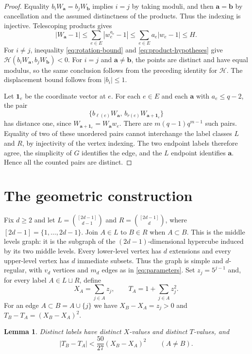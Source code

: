 \documentclass[a4paper,11pt]{amsart}
\newtheorem{lemma}[theorem]{Lemma}
\theoremstyle{remark}
\newcommand{\Hh}{\mathcal H}
\begin{document}
\begin{proof}
Equality $b_iW_{\mathbf a}=b_jW_{\mathbf b}$ implies $i=j$ by taking
moduli, and then $\mathbf a=\mathbf b$ by cancellation and the assumed
distinctness of the products. Thus the indexing is injective.
Telescoping products gives
\[
 |W_{\mathbf a}-1|
 \le\sum_{e\in E}|w_e^{a_e}-1|
 \le\sum_{e\in E}a_e|w_e-1|\le H.
\]
For $i\ne j$, inequality \eqref{eq:rotation-bound} and
\eqref{eq:product-hypotheses} give
$\Hh(b_iW_{\mathbf a},b_jW_{\mathbf b})<0$.
For $i=j$ and $\mathbf a\ne\mathbf b$, the points are distinct and have
equal modulus, so the same conclusion follows from the preceding
identity for $\Hh$. The displacement bound follows from $|b_i|\le1$.

Let $\mathbf1_e$ be the coordinate vector at $e$.
For each $e\in E$ and each $\mathbf a$ with $a_e\le q-2$, the pair
\[
 \bigl\{b_{\ell(e)}W_{\mathbf a},\,
        b_{r(e)}W_{\mathbf a+\mathbf1_e}\bigr\}
\]
has distance one, since $W_{\mathbf a+\mathbf1_e}=W_{\mathbf a}w_e$.
There are $m(q-1)q^{m-1}$ such pairs. Equality of two of these unordered
pairs cannot interchange the label classes $L$ and $R$, by injectivity
of the vertex indexing. The two endpoint labels therefore agree, the
simplicity of $G$ identifies the edge, and the $L$ endpoint identifies
$\mathbf a$. Hence all the counted pairs are distinct.
\end{proof}

\section{The geometric construction}

Fix $d\ge2$ and let
$L=\binom{[2d-1]}{d-1}$ and $R=\binom{[2d-1]}d$, where
$[2d-1]=\{1,\ldots,2d-1\}$.
Join $A\in L$ to $B\in R$ when $A\subset B$.
This is the middle levels graph: it is the subgraph of the
$(2d-1)$-dimensional hypercube induced by its two middle levels.
Every lower-level vertex has $d$ extensions and every upper-level
vertex has $d$ immediate subsets. Thus the graph is simple and
$d$-regular, with $v_d$ vertices and $m_d$ edges as in
\eqref{eq:parameters}.
Set $z_j=5^{j-1}$ and, for every label $A\in L\sqcup R$, define
\begin{equation}\label{eq:digits}
 X_A=\sum_{j\in A}z_j,\qquad T_A=1+\sum_{j\in A}z_j^2.
\end{equation}
For an edge $A\subset B=A\cup\{j\}$ we have
$X_B-X_A=z_j>0$ and $T_B-T_A=(X_B-X_A)^2$.

\begin{lemma}\label{lem:digits}
Distinct labels have distinct $X$-values and distinct $T$-values, and
\begin{equation}\label{eq:digit-bound}
 |T_B-T_A|<\frac{50}{27}(X_B-X_A)^2\qquad(A\ne B).
\end{equation}
\end{lemma}
\end{document}
